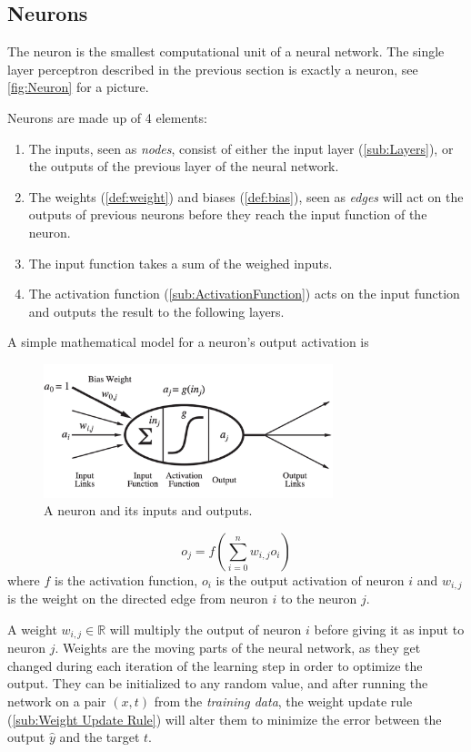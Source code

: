 \documentclass{article}
\begin{document}
 \subsection{Neurons}%
  \label{sub:Neurons}
The neuron is the smallest computational unit of a neural network. The single layer perceptron described in the previous section is exactly a neuron, see \autoref{fig:Neuron} for a picture.  
\begin{definition}[Neurons]
  Neurons are made up of 4 elements: 
  \begin{enumerate}
    \item The inputs, seen as \textit{nodes}, consist of either the input layer (\autoref{sub:Layers}), or the outputs of the previous layer of the neural network. 
    \item The weights (\autoref{def:weight}) and biases (\autoref{def:bias}), seen as \textit{edges} will act on the outputs of previous neurons before they reach the input function of the neuron. 
    \item The input function takes a sum of the weighed inputs. 
    \item The activation function (\autoref{sub:ActivationFunction}) acts on the input function and outputs the result to the following layers. 
  \end{enumerate}
   A simple mathematical model for a neuron's output activation is \citep{book:AIModernApp}
  \begin{figure}
    \centering
    \includegraphics[width=0.75\textwidth]{Neuron}
    \caption{A neuron and its inputs and outputs.}
    \label{fig:Neuron}
  \end{figure}
  $$o_j = f \left( \sum^{n}_{i=0}w_{i,j} o_i  \right)$$
  where $f$ is the activation function, $o_i$ is the output activation of neuron $i$ and $w_{i,j}$ is the weight on the directed edge from neuron $i$ to the neuron $j$. 
\end{definition}
\begin{definition}[Weights]\label{def:weight}
  A weight $w_{i,j} \in \mathbb{R}$ will multiply the output of neuron $i$ before giving it as input to neuron $j$. Weights are the moving parts of the neural network, as they get changed during each iteration of the learning step in order to optimize the output. They can be initialized to any random value, and after running the network on a pair $(x,t)$ from the \textit{training data}, the weight update rule (\autoref{sub:Weight Update Rule}) will alter them to minimize the error between the output $\hat y$ and the target $t.$ 
\end{definition}
\end{document}
